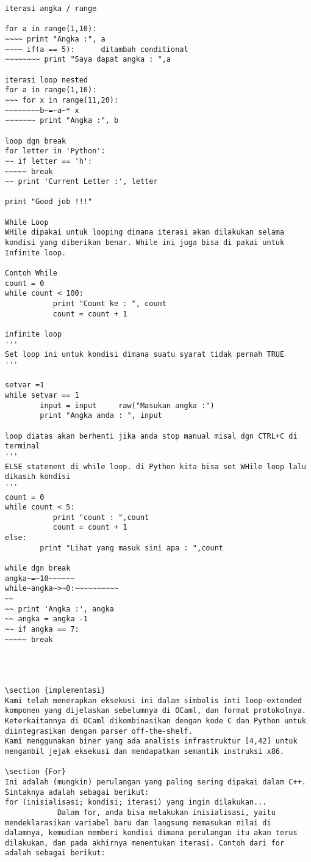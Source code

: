 \begin{verbatim}
iterasi angka / range 

for a in range(1,10): 
~~~~ print "Angka :", a 
~~~~ if(a == 5):      ditambah conditional 
~~~~~~~~ print "Saya dapat angka : ",a 

iterasi loop nested 
for a in range(1,10): 
~~~ for x in range(11,20): 
~~~~~~~~b~=~a~* x      
~~~~~~~ print "Angka :", b 

loop dgn break 
for letter in 'Python': 
~~ if letter == 'h': 
~~~~~ break 
~~ print 'Current Letter :', letter 

print "Good job !!!" 

While Loop 
WHile dipakai untuk looping dimana iterasi akan dilakukan selama kondisi yang diberikan benar. While ini juga bisa di pakai untuk Infinite loop. 

Contoh While 
count = 0 
while count < 100: 
           print "Count ke : ", count 
           count = count + 1 

infinite loop 
''' 
Set loop ini untuk kondisi dimana suatu syarat tidak pernah TRUE 
''' 

setvar =1 
while setvar == 1 
        input = input     raw("Masukan angka :") 
        print "Angka anda : ", input 

loop diatas akan berhenti jika anda stop manual misal dgn CTRL+C di terminal 
''' 
ELSE statement di while loop. di Python kita bisa set WHile loop lalu dikasih kondisi 
''' 
count = 0 
while count < 5: 
           print "count : ",count 
           count = count + 1 
else: 
        print "Lihat yang masuk sini apa : ",count 

while dgn break 
angka~=~10~~~~~~    
while~angka~>~0:~~~~~~~~~~     
~~  
~~ print 'Angka :', angka 
~~ angka = angka -1 
~~ if angka == 7: 
~~~~~ break 




\section {implementasi}
Kami telah menerapkan eksekusi ini dalam simbolis inti loop-extended komponen yang dijelaskan sebelumnya di OCaml, dan format protokolnya. 
Keterkaitannya di OCaml dikombinasikan dengan kode C dan Python untuk diintegrasikan dengan parser off-the-shelf. 
Kami menggunakan biner yang ada analisis infrastruktur [4,42] untuk mengambil jejak eksekusi dan mendapatkan semantik instruksi x86.

\section {For}
Ini adalah (mungkin) perulangan yang paling sering dipakai dalam C++. Sintaknya adalah sebagai berikut:
for (inisialisasi; kondisi; iterasi) yang ingin dilakukan...
            Dalam for, anda bisa melakukan inisialisasi, yaitu mendeklarasikan variabel baru dan langsung memasukan nilai di dalamnya, kemudian memberi kondisi dimana perulangan itu akan terus dilakukan, dan pada akhirnya menentukan iterasi. Contoh dari for adalah sebagai berikut:


\end{verbatim}
